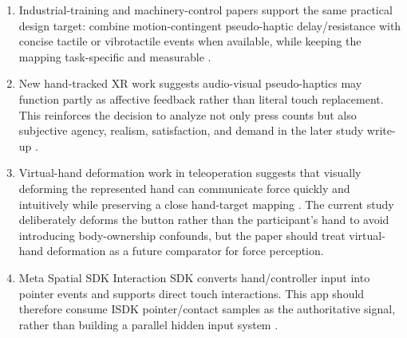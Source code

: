 \documentclass[11pt]{article}
\begin{document}
\begin{enumerate}
  \item Industrial-training and machinery-control papers support the same practical design target: combine motion-contingent pseudo-haptic delay/resistance with concise tactile or vibrotactile events when available, while keeping the mapping task-specific and measurable \cite{hwang2024industrial,matthews2023remapped,shi2024haptics}.
  \item New hand-tracked XR work suggests audio-visual pseudo-haptics may function partly as affective feedback rather than literal touch replacement. This reinforces the decision to analyze not only press counts but also subjective agency, realism, satisfaction, and demand in the later study write-up \cite{david2026feelings}.
  \item Virtual-hand deformation work in teleoperation suggests that visually deforming the represented hand can communicate force quickly and intuitively while preserving a close hand-target mapping \cite{hotta2024handdeformation}. The current study deliberately deforms the button rather than the participant's hand to avoid introducing body-ownership confounds, but the paper should treat virtual-hand deformation as a future comparator for force perception.
  \item Meta Spatial SDK Interaction SDK converts hand/controller input into pointer events and supports direct touch interactions. This app should therefore consume ISDK pointer/contact samples as the authoritative signal, rather than building a parallel hidden input system \cite{meta2026isdk}.
\end{enumerate}
\end{document}
